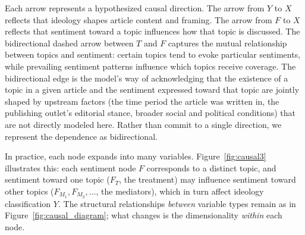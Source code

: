 Each arrow represents a hypothesized causal direction. The arrow from $Y$ to $X$ reflects that ideology shapes article content and framing. The arrow from $F$ to $X$ reflects that sentiment toward a topic influences how that topic is discussed. The bidirectional dashed arrow between $T$ and $F$ captures the mutual relationship between topics and sentiment: certain topics tend to evoke particular sentiments, while prevailing sentiment patterns influence which topics receive coverage. The bidirectional edge is the model's way of acknowledging that the existence of a topic in a given article and the sentiment expressed toward that topic are jointly shaped by upstream factors (the time period the article was written in, the publishing outlet's editorial stance, broader social and political conditions) that are not directly modeled here. Rather than commit to a single direction, we represent the dependence as bidirectional.

In practice, each node expands into many variables. Figure~\ref{fig:causal3} illustrates this: each sentiment node $F$ corresponds to a distinct topic, and sentiment toward one topic ($F_T$, the treatment) may influence sentiment toward other topics ($F_{M_1}, F_{M_2}, \ldots$, the mediators), which in turn affect ideology classification $Y$. The structural relationships \textit{between} variable types remain as in Figure~\ref{fig:causal_diagram}; what changes is the dimensionality \textit{within} each node.

